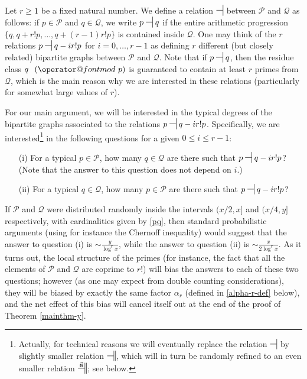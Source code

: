 \documentclass[11pt]{amsart}
\makeatletter
\numberwithin{equation}{section}  %
\theoremstyle{remark}
\theoremstyle{plain}
\numberwithin{equation}{section}
\renewcommand{\pmod}[1]{\allowbreak\mkern7mu({\operator@font mod}\,\,#1)}
\renewcommand{\leq}{\leqslant}
\renewcommand{\geq}{\geqslant}
\renewcommand{\(}{\left(}
\renewcommand{\)}{\right)}
\newcommand{\asym}{\sim}   %
\newcommand{\rel}{\nsststile{}{}}  %
\newcommand{\relr}{\nsdtstile{}{}} %
\newcommand{\relra}{\nsdtstile{}{\vect{\mathbf{a}}}} %
\newcommand{\vect}[1]{{\ensuremath{\vec{#1}}}}
\newcommand{\PP}{\mathcal{P}}
\newcommand{\QQ}{\mathcal{Q}}
\makeatother
\begin{document}
Let $r \geq 1$ be a fixed natural number.  We define a relation $\rel$
between $\PP$ and $\QQ$  as follows: if $p \in \PP$ and $q \in \QQ$,
we write $p \rel q$ if the entire arithmetic progression $\{ q, q+r!
p, \dots, q+(r-1)r! p \}$ is contained inside $\QQ$.   
One may think of the $r$ relations $p \rel q-ir!p$ for $i=0,\dots,r-1$
as defining $r$ different (but closely related) bipartite graphs
between $\PP$ and $\QQ$.  Note that if $p \rel q$, then the residue
class $q\ \pmod{p}$ is guaranteed to contain at least $r$ primes from
$\QQ$, which is the main reason why we are interested in these
relations (particularly for somewhat large values of $r$).


For our main argument, we will be interested in the typical degrees of the bipartite graphs associated to the relations $p \rel q-ir!p$.  Specifically, we are interested\footnote{Actually, for technical reasons we will eventually replace the relation $\rel$ by slightly smaller relation $\relr$, which will in turn be randomly refined to an even smaller relation $\relra$; see below.} in the following questions for a given $0 \leq i \leq r-1$:

\begin{itemize}
\item[(i)] For a typical $p \in \PP$, how many $q \in \QQ$ are there such that $p \rel q-ir!p$?  (Note that the answer to this question does not depend on $i$.)
\item[(ii)]  For a typical $q \in \QQ$, how many $p \in \PP$ are there such that $p \rel q-ir!p$?
\end{itemize}

If $\PP$ and $\QQ$ were distributed randomly inside the intervals $(x/2,x]$ and $(x/4,y]$ respectively, with cardinalities given by \eqref{pq}, then standard probabilistic arguments (using for instance the Chernoff inequality) would suggest that the answer to question (i) is $\asym\frac{y}{\log^r x}$, while the answer to question (ii) is $\asym\frac{x}{2 \log^r x}$.  As it turns out, the local structure of the primes (for instance, the fact that all the elements of $\PP$ and $\QQ$ are coprime to $r!$) will bias the answers to each of these two questions; however (as one may expect from double counting considerations), they will be biased by exactly the same factor $\alpha_r$ (defined in \eqref{alpha-r-def} below), and the net effect of this bias will cancel itself out at the end of the proof of Theorem \ref{mainthm-y}.
\end{document}
